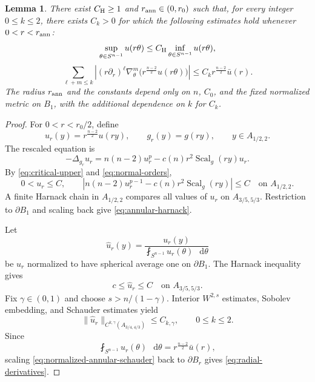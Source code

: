 \documentclass[11pt]{article}
\numberwithin{equation}{section}
\newtheorem{lemma}[theorem]{Lemma}
\theoremstyle{remark}
\newcommand{\Sph}{S}
\newcommand{\pa}{\partial}
\newcommand{\norm}[1]{\lVert #1\rVert}
\newcommand{\dd}{\mathop{}\!\mathrm{d}}
\begin{document}
\par
\begin{lemma}\label{lem:radial-harnack}
{
There exist \(C_{\rm H}\ge1\) and \(r_{\rm ann}\in(0,r_0)\) such that,
for every integer \(0\le k\le2\), there exists \(C_k>0\) for which the
following estimates hold whenever \(0<r<r_{\rm ann}\):
}
\begin{equation}\label{eq:annular-harnack}
 \sup_{\theta\in\Sph^{n-1}}u(r\theta)
 \le C_{\rm H}\inf_{\theta\in\Sph^{n-1}}u(r\theta),
\end{equation}
\begin{equation}\label{eq:radial-derivatives}
 {\sum_{\ell+m\le k}
 \left|
 (r\pa_r)^\ell\nabla_\theta^m
 \bigl(r^{\frac{n-2}{2}}u(r\theta)\bigr)
 \right|
 \le C_k r^{\frac{n-2}{2}}\bar u(r).}
\end{equation}
{The radius \(r_{\rm ann}\) and the constants depend only on
\(n\), \(C_0\), and the fixed normalized metric on \(B_1\), with the
additional dependence on \(k\) for \(C_k\).}
\end{lemma}

\begin{proof}
For \(0<r<r_0/2\), define
\[
 u_r(y)=r^{\frac{n-2}{2}}u(ry),
 \qquad
 g_r(y)=g(ry),
 \qquad y\in A_{1/2,2}.
\]
The rescaled equation is
\[
 -\Delta_{g_r}u_r
 =
 n(n-2)u_r^p-c(n)r^2\operatorname{Scal}_g(ry)u_r.
\]
By \eqref{eq:critical-upper} and \eqref{eq:normal-orders},
\[
 0<u_r\le C,
 \qquad
 \left|
 n(n-2)u_r^{p-1}-c(n)r^2\operatorname{Scal}_g(ry)
 \right|
 \le C
 \quad\text{on }A_{1/2,2}.
\]
{A finite Harnack chain in \(A_{1/2,2}\) compares all values
of \(u_r\) on \(A_{3/5,5/3}\). Restriction to \(\partial B_1\) and scaling
back give \eqref{eq:annular-harnack}.}

Let 
\[
\widehat u_r(y)
=\frac{u_r(y)}
{\fint_{\Sph^{n-1}}u_r(\theta)\,\dd\theta}
\]
be \(u_r\) normalized to have spherical average one on \(\partial B_1\).
The Harnack inequality gives
\[
 c\le\widehat u_r\le C
 \quad\text{on }A_{3/5,5/3}.
\]
Fix \(\gamma\in(0,1)\) and choose \(s>n/(1-\gamma)\). Interior
\(W^{2,s}\) estimates, Sobolev embedding, and Schauder estimates yield
\begin{equation}\label{eq:normalized-annular-schauder}
 \norm{\widehat u_r}_{C^{k,\gamma}(A_{3/4,4/3})}
 \le C_{k,\gamma},
 \qquad 0\le k\le2.
\end{equation}
Since
\[
 \fint_{\Sph^{n-1}}u_r(\theta)\,\dd\theta
 =r^{\frac{n-2}{2}}\bar u(r),
\]
scaling \eqref{eq:normalized-annular-schauder} back to \(\partial B_r\)
gives \eqref{eq:radial-derivatives}.
\end{proof}
\end{document}
